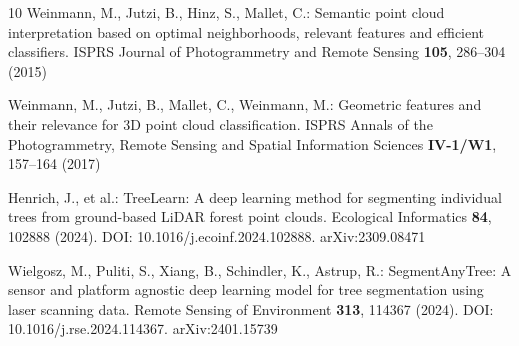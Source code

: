 \documentclass[runningheads]{llncs}
\begin{document}
\begin{thebibliography}{10}
Weinmann, M., Jutzi, B., Hinz, S., Mallet, C.:
Semantic point cloud interpretation based on optimal neighborhoods, relevant features and efficient classifiers.
ISPRS Journal of Photogrammetry and Remote Sensing \textbf{105}, 286--304 (2015)

Weinmann, M., Jutzi, B., Mallet, C., Weinmann, M.:
Geometric features and their relevance for 3D point cloud classification.
ISPRS Annals of the Photogrammetry, Remote Sensing and Spatial Information Sciences \textbf{IV-1/W1}, 157--164 (2017)


Henrich, J., et al.:
TreeLearn: A deep learning method for segmenting individual trees from ground-based LiDAR forest point clouds.
Ecological Informatics \textbf{84}, 102888 (2024).
DOI: 10.1016/j.ecoinf.2024.102888. arXiv:2309.08471

Wielgosz, M., Puliti, S., Xiang, B., Schindler, K., Astrup, R.:
SegmentAnyTree: A sensor and platform agnostic deep learning model for tree segmentation using laser scanning data.
Remote Sensing of Environment \textbf{313}, 114367 (2024).
DOI: 10.1016/j.rse.2024.114367. arXiv:2401.15739


\end{thebibliography}
\end{document}
